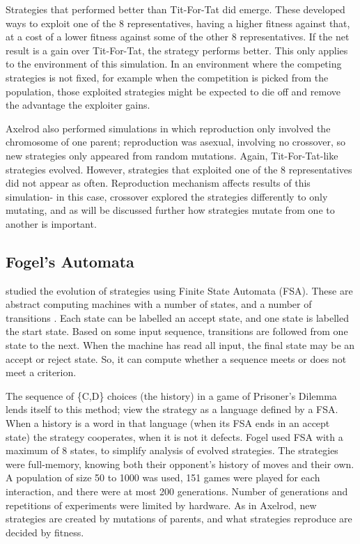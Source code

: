 \documentclass[a4paper,11pt]{article}
\begin{document}
Strategies that performed better than Tit-For-Tat did emerge. These developed ways to exploit one of the 8 representatives, having a higher fitness against that, at a cost of a lower fitness against some of the other 8 representatives. If the net result is a gain over Tit-For-Tat, the strategy performs better. 
This only applies to the environment of this simulation. 
In an environment where the competing strategies is not fixed, for example when the competition is picked from the population, those exploited strategies might be expected to die off and remove the advantage the exploiter gains. 

Axelrod also performed simulations in which reproduction only involved the chromosome of one parent; reproduction was asexual, involving no crossover, so new strategies only appeared from random mutations. 
Again, Tit-For-Tat-like strategies evolved. However, strategies that exploited one of the 8 representatives did not appear as often. Reproduction mechanism affects results of this simulation- in this case, crossover explored the strategies differently to only mutating, and as will be discussed further how strategies mutate from one to another is important. 

\subsection{Fogel's Automata}
\citet{fogel1993evolving} studied the evolution of strategies using Finite State Automata (FSA). 
These are abstract computing machines with a number of states, and a number of transitions \citep{Sipser2006}. 
Each state can be labelled an accept state, and one state is labelled the start state. 
Based on some input sequence, transitions are followed from one state to the next. 
When the machine has read all input, the final state may be an accept or reject state. 
So, it can compute whether a sequence meets or does not meet a criterion. 

The sequence of \{C,D\} choices (the history) in a game of Prisoner's Dilemma lends itself to this method; view the strategy as a language defined by a FSA. When a history is a word in that language (when its FSA ends in an accept state) the strategy cooperates, when it is not it defects. Fogel used FSA with a maximum of 8 states, to simplify analysis of evolved strategies. The strategies were full-memory, knowing both their opponent's history of moves and their own. 
A population of size 50 to 1000 was used, 151 games were played for each interaction, and there were at most 200 generations. 
Number of generations and repetitions of experiments were limited by hardware. As in Axelrod, new strategies are created by mutations of parents, and what strategies reproduce are decided by fitness. 
\end{document}
